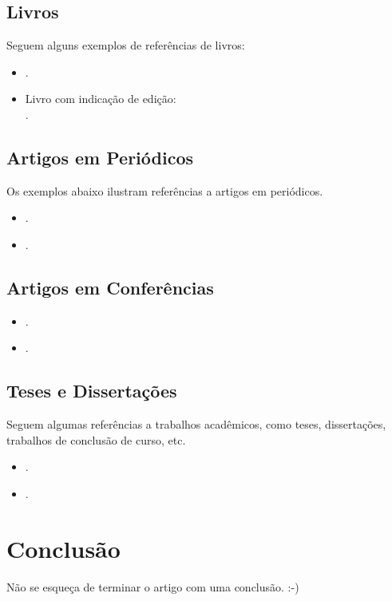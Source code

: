 \documentclass[twoside,english,brazilian]{UNISINOSartigo}
\begin{document}
\subsection{Livros}
Seguem alguns exemplos de referências de livros:
\begin{itemize}
	\item {}.
	\item Livro com indicação de edição:\\
	.
\end{itemize}

\subsection{Artigos em Periódicos}
Os exemplos abaixo ilustram referências a artigos em periódicos.
\begin{itemize}
	\item {}.
	\item {}.
\end{itemize}

\subsection{Artigos em Conferências}
\begin{itemize}
	\item {}.
	\item {}.
\end{itemize}

\subsection{Teses e Dissertações}
Seguem algumas referências a trabalhos acadêmicos, como teses, dissertações, trabalhos de conclusão de curso, etc.
\begin{itemize}
	\item {}.
	\item {}.
\end{itemize}

\section{Conclusão}
Não se esqueça de terminar o artigo com uma conclusão. :-)
\end{document}
